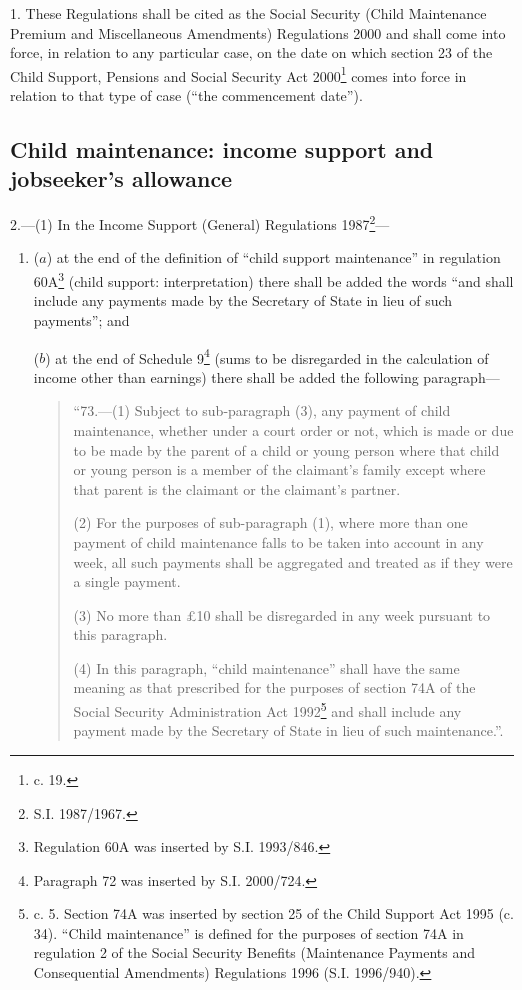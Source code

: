 \documentclass[12pt,a4paper]{article}
\begin{document}
1.  These Regulations shall be cited as the Social Security (Child Maintenance Premium and Miscellaneous Amendments) Regulations 2000 and shall come into force, in relation to any particular case, on the date on which section 23 of the Child Support, Pensions and Social Security Act 2000\footnote{ c. 19.} comes into force in relation to that type of case (“the commencement date”).

\subsection[2. Child maintenance: income support and jobseeker’s allowance]{\sloppy Child maintenance: income support and jobseeker’s allowance}

2.---(1)  In the Income Support (General) Regulations 1987\footnote{\frenchspacing S.I. 1987/1967.}—
\begin{enumerate}\item[]
($a$) at the end of the definition of “child support maintenance” in regulation 60A\footnote{\frenchspacing Regulation 60A was inserted by S.I. 1993/846.} (child support: interpretation) there shall be added the words “and shall include any payments made by the Secretary of State in lieu of such payments”; and

($b$) at the end of Schedule 9\footnote{\frenchspacing Paragraph 72 was inserted by S.I. 2000/724.} (sums to be disregarded in the calculation of income other than earnings) there shall be added the following paragraph—
\begin{quotation}
“73.---(1)  Subject to sub-paragraph (3), any payment of child maintenance, whether under a court order or not, which is made or due to be made by the parent of a child or young person where that child or young person is a member of the claimant’s family except where that parent is the claimant or the claimant’s partner.

(2) For the purposes of sub-paragraph (1), where more than one payment of child maintenance falls to be taken into account in any week, all such payments shall be aggregated and treated as if they were a single payment.

(3) No more than £10 shall be disregarded in any week pursuant to this paragraph.

(4) In this paragraph, “child maintenance” shall have the same meaning as that prescribed for the purposes of section 74A of the Social Security Administration Act 1992\footnote{ c. 5. Section 74A was inserted by section 25 of the Child Support Act 1995 (c. 34). “Child maintenance” is defined for the purposes of section 74A in regulation 2 of the Social Security Benefits (Maintenance Payments and Consequential Amendments) Regulations 1996 (S.I. 1996/940).} and shall include any payment made by the Secretary of State in lieu of such maintenance.”.
\end{quotation}
\end{enumerate}
\end{document}
